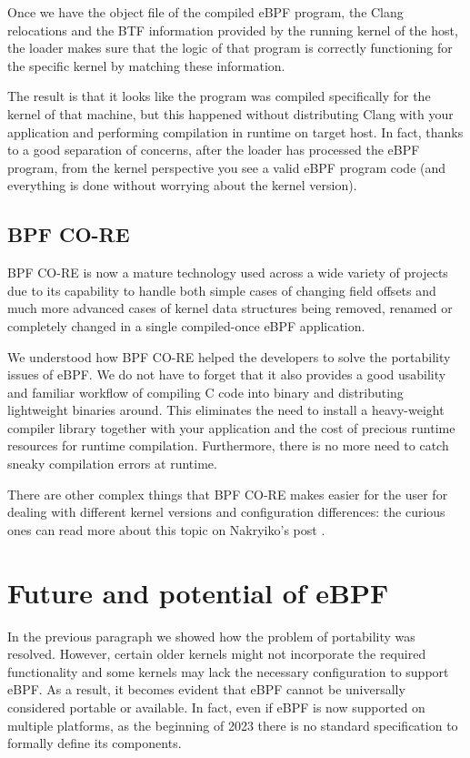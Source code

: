 Once we have the object file of the compiled eBPF program, the Clang relocations and the BTF information provided by the running kernel of the host, the loader makes sure that the logic of that program is correctly functioning for the specific kernel by matching these information.

The result is that it looks like the program was compiled specifically for the kernel of that machine, but this happened without distributing Clang with your application and performing compilation in runtime on target host.
In fact, thanks to a good separation of concerns, after the loader has processed the eBPF program, from the kernel perspective you see a valid eBPF program code (and everything is done without worrying about the kernel version).

\subsection{BPF CO-RE}

BPF CO-RE is now a mature technology used across a wide variety of projects due to its capability to handle both simple cases of changing field offsets and much more advanced cases of kernel data structures being removed, renamed or completely changed in a single compiled-once eBPF application.

We understood how BPF CO-RE helped the developers to solve the portability issues of eBPF.
We do not have to forget that it also provides a good usability and familiar workflow of compiling C code into binary and distributing lightweight binaries around. 
This eliminates the need to install a heavy-weight compiler library together with your application and the cost of precious runtime resources for runtime compilation. 
Furthermore, there is no more need to catch sneaky compilation errors at runtime.

There are other complex things that BPF CO-RE makes easier for the user for dealing with different kernel versions and configuration differences: the curious ones can read more about this topic on Nakryiko's post \cite{ANCOREPost}.

\section{Future and potential of eBPF}

In the previous paragraph we showed how the problem of portability was resolved.
However, certain older kernels might not incorporate the required functionality and some kernels may lack the necessary configuration to support eBPF. 
As a result, it becomes evident that eBPF cannot be universally considered portable or available.
In fact, even if eBPF is now supported on multiple platforms, as the beginning of 2023 there is no standard specification to formally define its components. 

